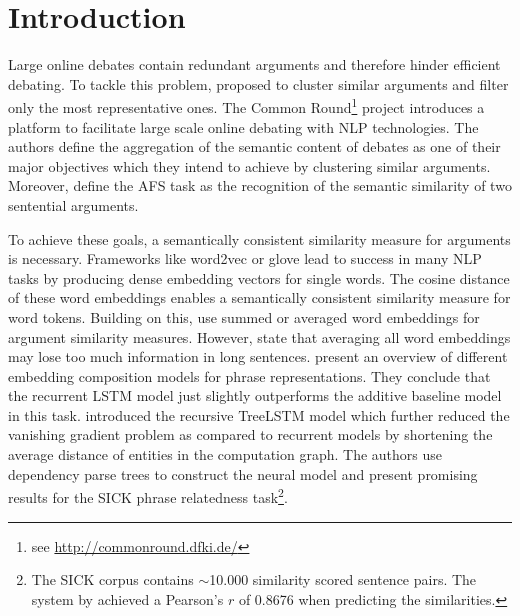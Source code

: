 \section{Introduction} %

Large online debates contain redundant arguments and therefore hinder efficient debating.
To tackle this problem, \Textcite{boltuzic_identifying_2015} proposed to cluster similar arguments and filter only the most representative ones. The Common Round\footnote{see \url{http://commonround.dfki.de/}} project \autocite{uszkoreit_common_2017} introduces a platform to facilitate large scale online debating with \ac{NLP} technologies. The authors define the aggregation of the semantic content of debates as one of their major objectives which they intend to achieve by clustering similar arguments.
Moreover, \Textcite{misra_measuring_2016} define the \ac{AFS} task as the recognition of the semantic similarity of two sentential arguments.

To achieve these goals, a semantically consistent similarity measure for arguments is necessary. Frameworks like word2vec \autocite{mikolov_distributed_2013} or glove \autocite{pennington_glove_2014} lead to success in many \ac{NLP} tasks by producing dense embedding vectors for single words. The cosine distance of these word embeddings enables a semantically consistent similarity measure for word tokens. Building on this, \Textcite{habernal_exploiting_2015,boltuzic_identifying_2015,misra_measuring_2016} use summed or averaged word embeddings for argument similarity measures. 
However, \Textcite{misra_measuring_2016} state that averaging all word embeddings may lose too much information in long sentences. \Textcite{wang_comparison_2017} present an overview of different embedding composition models for phrase representations. They conclude that the recurrent \ac{LSTM} model \autocite{hochreiter_long_1997} just slightly outperforms the additive baseline model in this task. \Textcite{tai_improved_2015} introduced the recursive TreeLSTM model which further reduced the vanishing gradient problem as compared to recurrent models by shortening the average distance of entities in the computation graph. The authors use dependency parse trees to construct the neural model and present promising results for the SICK phrase relatedness task\footnote{The SICK corpus \autocite{marelli_sick_2014} contains $\sim$10.000 similarity scored sentence pairs. The system by \Textcite{tai_improved_2015} achieved a Pearson's $r$ of 0.8676 when predicting the similarities.}. 

